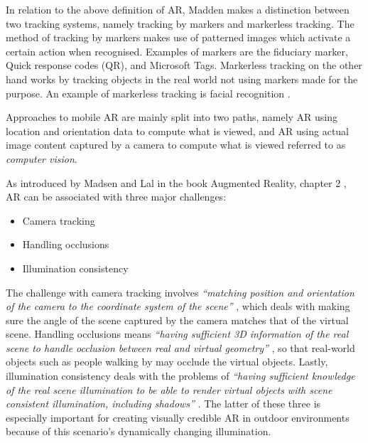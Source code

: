In relation to the above definition of AR, Madden makes a distinction between two tracking systems, namely tracking by markers and markerless tracking. The method of tracking by markers makes use of patterned images which activate a certain action when recognised. Examples of markers are the fiduciary marker, Quick response codes (QR), and Microsoft Tags. Markerless tracking on the other hand works by tracking objects in the real world not using markers made for the purpose. An example of markerless tracking is facial recognition \cite{Madden2011}.

Approaches to mobile AR are mainly split into two paths, namely AR using location and orientation data to compute what is viewed, and AR using actual image content captured by a camera to compute what is viewed referred to as \textit{computer vision}.

As introduced by Madsen and Lal in the book Augmented Reality, chapter 2 \cite{Lal2010}, AR can be associated with three major challenges:

\begin{itemize}
\item Camera tracking 
\item Handling occlusions
\item Illumination consistency
\end{itemize}

The challenge with camera tracking involves \textit{“matching position and orientation of the camera to the coordinate system of the scene”} \cite{Lal2010}, which deals with making sure the angle of the scene captured by the camera matches that of the virtual scene. Handling occlusions means \textit{“having sufficient 3D information of the real scene to handle occlusion between real and virtual geometry”} \cite{Lal2010}, so that real-world objects such as people walking by may occlude the virtual objects. Lastly, illumination consistency deals with the problems of \textit{“having sufficient knowledge of the real scene illumination to be able to render virtual objects with scene consistent illumination, including shadows”} \cite{Lal2010}. The latter of these three is especially important for creating visually credible AR in outdoor environments because of this scenario’s dynamically changing illumination.

